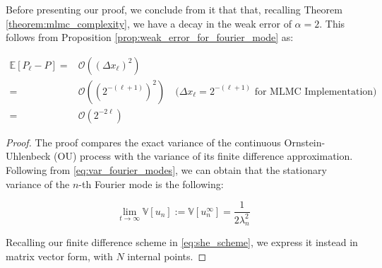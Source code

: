 Before presenting our proof, we conclude from it that
that, recalling Theorem \ref{theorem:mlmc_complexity}, 
we have a decay in the weak error of $\alpha = 2$. This follows from Proposition 
\ref{prop:weak_error_for_fourier_mode} as:

\begin{align*}
    \mathbb{E}[P_\ell - P] =& \mathcal{O}\left((\Delta x_\ell)^2\right)\\
                           =& \mathcal{O}\left((2^{-(\ell + 1)})^2\right) 
                           \quad (\Delta x_\ell = 2^{-(\ell+1)} \text{ for MLMC Implementation)}\\
                           =& \mathcal{O}\left( 2^{-2\ell}\right)
\end{align*}


\begin{proof}
The proof compares the exact variance of the
continuous Ornstein-Uhlenbeck 
(OU) process
with the variance of its finite difference approximation. 
Following from \eqref{eq:var_fourier_modes}, we can obtain that the 
stationary variance of the $n$-th Fourier mode is the following:

\begin{equation}\label{eq:stationary_variance}
    \lim_{t \to \infty} \mathbb{V}[u_n]
    := \mathbb{V}[u_n^{\infty}] = \frac{1}{2\lambda_n^2}
\end{equation}

Recalling our finite difference scheme in \eqref{eq:she_scheme},
we express it instead in matrix vector form, with $N$ 
internal points.


\end{proof}
